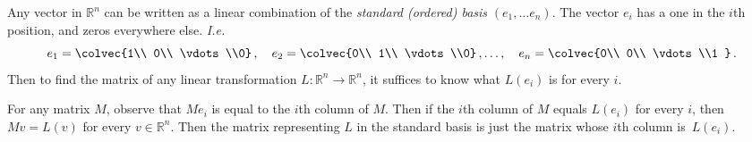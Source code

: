 \begin{example}
Any vector in $\mathbb{R}^n$ can be written as a linear combination of the \emph{standard (ordered) basis} $(e_1,\dots e_n)$.  
The vector $e_i$ has a one in the $i$th position, and zeros everywhere else.  {\itshape I.e.}
\[
e_1=\colvec{1\\ 0\\ \vdots \\0}\, ,\quad e_2=\colvec{0\\ 1\\ \vdots \\0}\, ,\ldots,\quad e_n=\colvec{0\\ 0\\ \vdots \\1 }\, .
\]
Then to find the matrix of any linear transformation $L \colon \mathbb{R}^n \rightarrow \mathbb{R}^n$, it suffices to know what $L(e_i)$ is for every $i$.  

For any matrix $M$, observe that $Me_i$ is equal to the $i$th column of $M$.  Then if the $i$th column of $M$ equals $L(e_i)$ for every $i$, then $Mv=L(v)$ for every $v\in \mathbb{R}^n$.  Then the matrix representing $L$ in the standard basis is just the matrix whose $i$th column is~$L(e_i)$. 


\end{example}
